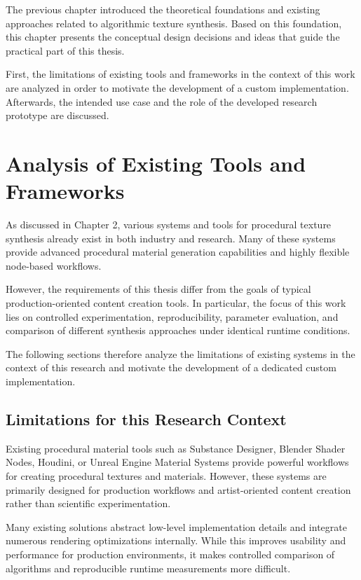 The previous chapter introduced the theoretical foundations and existing approaches related to algorithmic texture synthesis. Based on this foundation, this chapter presents the conceptual design decisions and ideas that guide the practical part of this thesis.

First, the limitations of existing tools and frameworks in the context of this work are analyzed in order to motivate the development of a custom implementation. Afterwards, the intended use case and the role of the developed research prototype are discussed.

\section{Analysis of Existing Tools and Frameworks}

As discussed in Chapter 2, various systems and tools for procedural texture synthesis already exist in both industry and research. Many of these systems provide advanced procedural material generation capabilities and highly flexible node-based workflows.

However, the requirements of this thesis differ from the goals of typical production-oriented content creation tools. In particular, the focus of this work lies on controlled experimentation, reproducibility, parameter evaluation, and comparison of different synthesis approaches under identical runtime conditions.

The following sections therefore analyze the limitations of existing systems in the context of this research and motivate the development of a dedicated custom implementation.

\subsection{Limitations for this Research Context}

Existing procedural material tools such as Substance Designer, Blender Shader Nodes, Houdini, or Unreal Engine Material Systems provide powerful workflows for creating procedural textures and materials. However, these systems are primarily designed for production workflows and artist-oriented content creation rather than scientific experimentation.

Many existing solutions abstract low-level implementation details and integrate numerous rendering optimizations internally. While this improves usability and performance for production environments, it makes controlled comparison of algorithms and reproducible runtime measurements more difficult.

